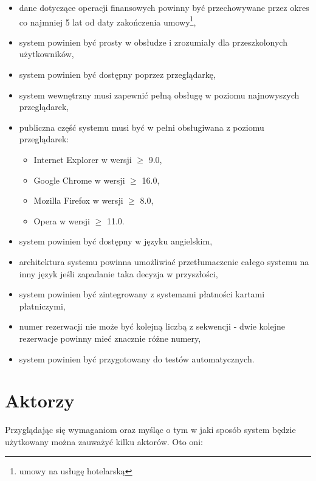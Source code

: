 \documentclass[a4paper,onecolumn,oneside,11pt,wide,floatssmall]{mwrep}
\theoremstyle{definition}
\theoremstyle{plain}%
\theoremstyle{remark}
\begin{document}
\begin{enumerate}
\begin{itemize}
\begin{itemize}
        \end{itemize}
      \item dane dotyczące operacji finansowych powinny być przechowywane przez okres co najmniej 5 lat od daty 
      zakończenia umowy\footnote{umowy na usługę hotelarską},
      \item system powinien być prosty w obsłudze i zrozumiały dla przeszkolonych użytkowników,
      \item system powinien być dostępny poprzez przeglądarkę,
      \item system wewnętrzny musi zapewnić pełną obsługę w poziomu najnowyszych przeglądarek,
      \item publiczna część systemu musi być w pełni obsługiwana z poziomu przeglądarek:
        \begin{itemize}
          \item Internet Explorer w wersji $\geq$ 9.0,
          \item Google Chrome w wersji $\geq$ 16.0,
          \item Mozilla Firefox w wersji $\geq$ 8.0,
          \item Opera w wersji $\geq$ 11.0.
        \end{itemize}
      \item system powinien być dostępny w języku angielskim,
      \item architektura systemu powinna umożliwiać przetłumaczenie całego systemu na inny język jeśli zapadanie taka 
      decyzja w przyszłości,
      \item system powinien być zintegrowany z systemami płatności kartami płatniczymi,
      \item numer rezerwacji nie może być kolejną liczbą z sekwencji - dwie kolejne rezerwacje powinny mieć znacznie 
      różne numery,
      \item system powinien być przygotowany do testów automatycznych.
    \end{itemize}
\end{enumerate}

\section{Aktorzy}
Przyglądając się wymaganiom oraz myśląc o tym w jaki sposób system będzie użytkowany można zauważyć kilku aktorów. Oto oni:
\end{document}
